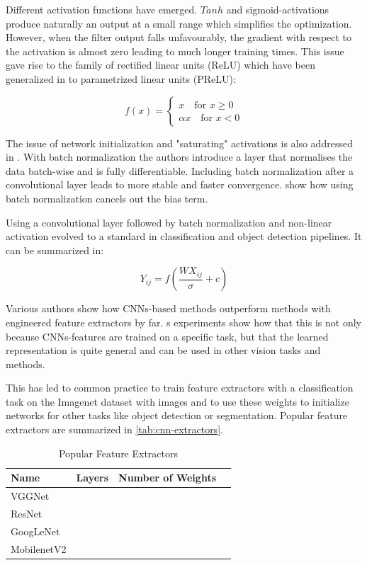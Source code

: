 	Different activation functions have emerged. $Tanh$ and sigmoid-activations produce naturally an output at a small range which simplifies the optimization. However, when the filter output falls unfavourably, the gradient with respect to the activation is almost zero leading to much longer training times. This issue gave rise to the family of rectified linear units (ReLU) which have been generalized in  to parametrized linear units (PReLU):
	
	$$
		f(x) = \begin{cases}
			x \quad \text{for } x \geq 0 \\
			\alpha x \quad \text{for } x < 0
		\end{cases}
	$$
	
	The issue of network initialization and "saturating" activations is also addressed in \cite{Ioffe2015}. With batch normalization the authors introduce a layer that normalises the data batch-wise and is fully differentiable. Including batch normalization after a convolutional layer leads to more stable and faster convergence.  show how using batch normalization cancels out the bias term.
		
	Using a convolutional layer followed by batch normalization and non-linear activation evolved to a standard in classification and object detection pipelines. It can be summarized in:
	
	$$
	Y_{ij} = f(\frac{WX_{ij}}{\sigma}+c)
	$$
	

	Various authors show how \acp{CNN}-based methods outperform methods with engineered feature extractors by far. \cite{Razavian}s experiments show how that this is not only because \acp{CNN}-features are trained on a specific task, but that  the learned representation is quite general and can be used in other vision tasks and methods.
	
	This has led to common practice to train feature extractors with a classification task on the Imagenet dataset with  images and to use these weights to initialize networks for other tasks like object detection or segmentation. Popular feature extractors are summarized in \autoref{tab:cnn-extractors}.
	
	\begin{table}[htbp]
		\centering
		\caption{Popular Feature Extractors}
		\begin{tabular}{l|l|l|l}
			Name & Layers & Number of Weights &  \\ \hline
			VGGNet &  &  &  \\ \hline
			ResNet &  &  &  \\ \hline
			GoogLeNet &  &  &  \\ \hline
			MobilenetV2 &  &  &
		\end{tabular}
		\label{tab:cnn-extractors}
	\end{table}
	

